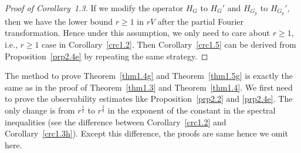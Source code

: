 \documentclass{article}
\numberwithin{equation}{section}
\numberwithin{equation}{section}
\theoremstyle{definition}
\begin{document}
\begin{proof}[Proof of Corollary~1.3]
If we modify the operator $H_{G}$ to  $H_{G}'$ and  $H_{G_p}$ to $H_{G_p}'$, then we have the lower bound $r\ge 1$ in  $rV$ after the partial Fourier transformation. Hence under this assumption, we only need to care about $r\ge 1$, i.e.,  $r\ge 1$ case in Corollary~\ref{crc1.2}. Then Corollary~\ref{crc1.5} can be derived from Proposition~\ref{prp2.4e} by repeating the same strategy.
\end{proof}


The method to prove Theorem~\ref{thm1.4g} and Theorem~\ref{thm1.5g} is exactly the same as in the proof of Theorem~\ref{thm1.3} and Theorem~\ref{thm1.4}. We first need to prove the observability estimates like Proposition~\ref{prp2.2} and \ref{prp2.4e}. The only change is from $r^{\frac{1}{2}}$ to $r^{\frac{2}{3}}$ in the exponent of the constant in the spectral inequalities (see the difference between Corollary~\ref{crc1.2} and Corollary~\ref{crc1.3h}). Except this difference, the proofs are same hence we omit here.



\end{document}
